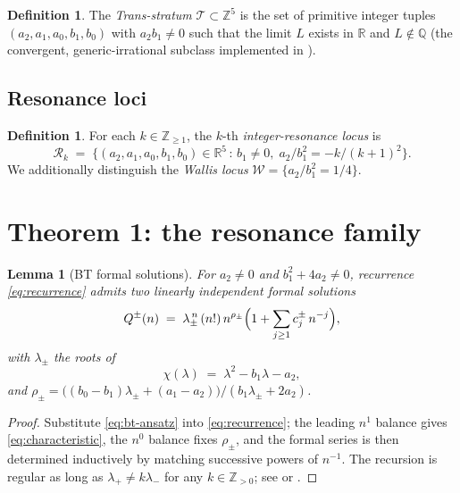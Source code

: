 \documentclass[11pt,a4paper]{article}
\newtheorem{lemma}[theorem]{Lemma}
\theoremstyle{definition}
\newtheorem{definition}[theorem]{Definition}
\begin{document}
\begin{definition}\label{def:trans-stratum}
The \emph{Trans-stratum} $\mathcal{T} \subset \mathbb{Z}^5$ is the set of primitive integer tuples $(a_2,a_1,a_0,b_1,b_0)$ with $a_2 b_1 \ne 0$ such that the limit $L$ exists in $\mathbb{R}$ and $L \notin \mathbb{Q}$ (the convergent, generic-irrational subclass implemented in \cite{siarc2024}).
\end{definition}

\subsection{Resonance loci}

\begin{definition}\label{def:Rk}
For each $k\in\mathbb{Z}_{\ge 1}$, the $k$-th \emph{integer-resonance locus} is
\[
  \mathcal{R}_k \;=\; \bigl\{(a_2,a_1,a_0,b_1,b_0)\in\mathbb{R}^5\,:\,b_1\ne 0,\;a_2/b_1^2 = -k/(k+1)^2\bigr\}.
\]
We additionally distinguish the \emph{Wallis locus} $\mathcal{W} = \{a_2/b_1^2 = 1/4\}$.
\end{definition}

\section{Theorem 1: the resonance family}\label{sec:resonance-family}

\begin{lemma}[BT formal solutions]\label{lem:bt-formal}
For $a_2 \ne 0$ and $b_1^2 + 4a_2 \ne 0$, recurrence \eqref{eq:recurrence} admits two linearly independent formal solutions
\begin{equation}\label{eq:bt-ansatz}
  Q^\pm(n) \;=\; \lambda_\pm^{\,n}\,(n!)\,n^{\rho_\pm}\Bigl(1 + \sum_{j\ge 1} c_j^\pm\,n^{-j}\Bigr),
\end{equation}
with $\lambda_\pm$ the roots of
\begin{equation}\label{eq:characteristic}
  \chi(\lambda) \;=\; \lambda^2 - b_1\lambda - a_2,
\end{equation}
and $\rho_\pm = \big((b_0-b_1)\lambda_\pm + (a_1-a_2)\big)\big/(b_1\lambda_\pm + 2a_2)$.
\end{lemma}

\begin{proof}
Substitute \eqref{eq:bt-ansatz} into \eqref{eq:recurrence}; the leading $n^1$ balance gives \eqref{eq:characteristic}, the $n^0$ balance fixes $\rho_\pm$, and the formal series is then determined inductively by matching successive powers of $n^{-1}$. The recursion is regular as long as $\lambda_+ \ne k\lambda_-$ for any $k\in\mathbb{Z}_{>0}$; see \cite[Thm.~1]{bt1932} or \cite[Ch.~VIII]{wasow1965}.
\end{proof}
\end{document}
